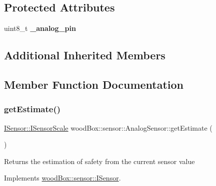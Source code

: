 \subsection*{Protected Attributes}
\begin{DoxyCompactItemize}
\item 
\mbox{\label{classwood_box_1_1sensor_1_1_analog_sensor_a0377173a16668660f492c52694f96fab}} 
uint8\+\_\+t {\bfseries \+\_\+analog\+\_\+pin}
\end{DoxyCompactItemize}
\subsection*{Additional Inherited Members}


\subsection{Member Function Documentation}
\mbox{\label{classwood_box_1_1sensor_1_1_analog_sensor_a74ddcfe84f3f5b9d7010442f365c4eee}} 
\subsubsection{\texorpdfstring{get\+Estimate()}{getEstimate()}}
{\footnotesize\ttfamily \mbox{\hyperlink{classwood_box_1_1sensor_1_1_i_sensor_aa377bda61ed0d4a1d7e1a7bffe459452}{I\+Sensor\+::\+I\+Sensor\+Scale}} wood\+Box\+::sensor\+::\+Analog\+Sensor\+::get\+Estimate (\begin{DoxyParamCaption}{ }\end{DoxyParamCaption})\hspace{0.3cm}{\ttfamily [virtual]}}

Returns the estimation of safety from the current sensor value 

Implements \mbox{\hyperlink{classwood_box_1_1sensor_1_1_i_sensor_afb01c2473efc4a823bf5dada0048d2bc}{wood\+Box\+::sensor\+::\+I\+Sensor}}.

\mbox{\label{classwood_box_1_1sensor_1_1_analog_sensor_ae78c25d8c01ba9acd03f90f278966189}} 
